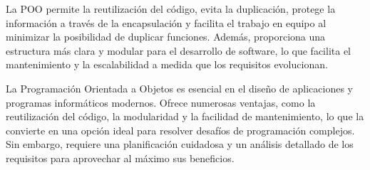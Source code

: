 La POO permite la reutilización del código, evita la duplicación, protege la información a través de la encapsulación y facilita el trabajo en equipo al minimizar la posibilidad de duplicar funciones. Además, proporciona una estructura más clara y modular para el desarrollo de software, lo que facilita el mantenimiento y la escalabilidad a medida que los requisitos evolucionan.

La Programación Orientada a Objetos es esencial en el diseño de aplicaciones y programas informáticos modernos. Ofrece numerosas ventajas, como la reutilización del código, la modularidad y la facilidad de mantenimiento, lo que la convierte en una opción ideal para resolver desafíos de programación complejos. Sin embargo, requiere una planificación cuidadosa y un análisis detallado de los requisitos para aprovechar al máximo sus beneficios.



 




